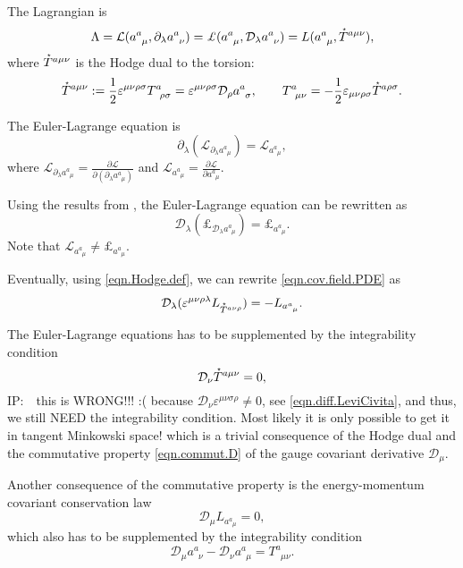 \documentclass[
10pt, %
a4paper, %
oneside, %
headinclude,footinclude, %
BCOR5mm, %
]{scrartcl}
\newcommand{\IP}[1]{{\color{Red}IP:\ \ #1}}
\newcommand{\pd}{\partial}
\newcommand{\tetr}[2]{a^{#1}_{\phantom{#1}#2}}
\newcommand{\D}[1]{\mathcal{D}_{#1}} %
\newcommand{\Tors}[2]{T^{#1}_{\phantom{a}#2}}
\newcommand{\Lag}{\mathcal{L}}	%
\newcommand{\Lagcov}{\pounds}%
\newcommand{\Laghodge}{L}%
\newcommand{\veps}{\varepsilon}
\newcommand{\HT}[1]{\accentset{\star}{T}^{#1}}
\begin{document}
The Lagrangian is 
\begin{equation}
\Lambda = \Lag(\tetr{a}{\mu},\pd_\lambda\tetr{a}{\nu}) = 
\Lagcov(\tetr{a}{\mu},\D{\lambda}\tetr{a}{\nu})  = \Laghodge(\tetr{a}{\mu},\HT{a\mu\nu}),
\end{equation}
where $ \HT{a\mu\nu} $ is the Hodge dual to the torsion:
\begin{equation}\label{eqn.Hodge.def}
\HT{a\mu\nu} := \frac{1}{2}\veps^{\mu\nu\rho\sigma}\Tors{a}{\rho\sigma} = 
\veps^{\mu\nu\rho\sigma}\D{\rho}\tetr{a}{\sigma}, \qquad \Tors{a}{\mu\nu} = 
-\frac{1}{2}\veps_{\mu\nu\rho\sigma}\HT{a\rho\sigma}.
\end{equation}




The Euler-Lagrange equation is
\begin{equation}
\pd_\lambda(\Lag_{\pd_\lambda\tetr{a}{\mu}}) = \Lag_{\tetr{a}{\mu}},
\end{equation}
where $ \Lag_{\pd_\lambda\tetr{a}{\mu}} = \frac{\pd \Lag}{\pd(\pd_\lambda\tetr{a}{\mu})} $ and $ 
\Lag_{\tetr{a}{\mu}} = \frac{\pd \Lag}{\pd \tetr{a}{\mu}} $.


Using the results from \cite{Lewis2009,Lorce2013}, the Euler-Lagrange equation can be rewritten as
\begin{equation}\label{eqn.cov.field.PDE}
\D{\lambda}(\Lagcov_{\D{\lambda}\tetr{a}{\mu}}) = \Lagcov_{\tetr{a}{\mu}}.
\end{equation}
Note that $  \Lag_{\tetr{a}{\mu}} \neq  \Lagcov_{\tetr{a}{\mu}}. $

Eventually, using \eqref{eqn.Hodge.def}, we can rewrite \eqref{eqn.cov.field.PDE} as
\begin{equation}\label{eqn.cov.field.PDE.Hodge}
\D{\lambda}(\veps^{\mu\nu\rho\lambda}\Laghodge_{\HT{a\nu\rho}}) =-\Laghodge_{\tetr{a}{\mu}}.
\end{equation}

The Euler-Lagrange equations has to be supplemented by the integrability condition
\begin{equation}
\D{\nu}\HT{a\mu\nu} = 0,
\end{equation}
\IP{this is WRONG!!! :( because $ \D{\nu}\veps^{\mu\nu\sigma\rho} \neq 0 $, see 
\eqref{eqn.diff.LeviCivita}, and thus, we still NEED the integrability condition. Most likely it is 
only possible to get it in tangent Minkowski space!}
which is a trivial consequence of the Hodge dual and the commutative property \eqref{eqn.commut.D} 
of the gauge 
covariant derivative $ \D{\mu} $.

Another consequence of the commutative property is the energy-momentum covariant conservation law
\begin{equation}
\D{\mu}\Laghodge_{\tetr{a}{\mu}} = 0,
\end{equation}
which also has to be supplemented by the integrability condition 
\begin{equation}
\D{\mu}\tetr{a}{\nu} - \D{\nu}\tetr{a}{\mu} = \Tors{a}{\mu\nu}.
\end{equation}
\end{document}
